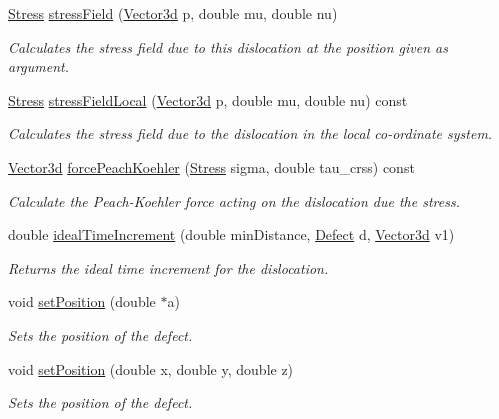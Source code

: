 \begin{DoxyCompactItemize}
\hyperlink{classStress}{\-Stress} \hyperlink{classDislocation_af61cedf5305080ce0f55eb7177efe529}{stress\-Field} (\hyperlink{classVector3d}{\-Vector3d} p, double mu, double nu)
\begin{DoxyCompactList}\small\item\em \-Calculates the stress field due to this dislocation at the position given as argument. \end{DoxyCompactList}\item 
\hyperlink{classStress}{\-Stress} \hyperlink{classDislocation_a26f938bfb630c3ba1b13522d7a422b8c}{stress\-Field\-Local} (\hyperlink{classVector3d}{\-Vector3d} p, double mu, double nu) const 
\begin{DoxyCompactList}\small\item\em \-Calculates the stress field due to the dislocation in the local co-\/ordinate system. \end{DoxyCompactList}\item 
\hyperlink{classVector3d}{\-Vector3d} \hyperlink{classDislocation_a9ca3f6fb280edaa1fbf156d75b8f0527}{force\-Peach\-Koehler} (\hyperlink{classStress}{\-Stress} sigma, double tau\-\_\-crss) const 
\begin{DoxyCompactList}\small\item\em \-Calculate the \-Peach-\/\-Koehler force acting on the dislocation due the stress. \end{DoxyCompactList}\item 
double \hyperlink{classDislocation_a6b02065fa97acefac00400182dea8738}{ideal\-Time\-Increment} (double min\-Distance, \hyperlink{classDefect}{\-Defect} d, \hyperlink{classVector3d}{\-Vector3d} v1)
\begin{DoxyCompactList}\small\item\em \-Returns the ideal time increment for the dislocation. \end{DoxyCompactList}\item 
void \hyperlink{classDefect_a2d233d13a8a93f6fba463a1fbc1c6c9f}{set\-Position} (double $\ast$a)
\begin{DoxyCompactList}\small\item\em \-Sets the position of the defect. \end{DoxyCompactList}\item 
void \hyperlink{classDefect_ad1a6acd8399d2ecabb7ce2b77623bbec}{set\-Position} (double x, double y, double z)
\begin{DoxyCompactList}\small\item\em \-Sets the position of the defect. \end{DoxyCompactList}\item 

\end{DoxyCompactItemize}
